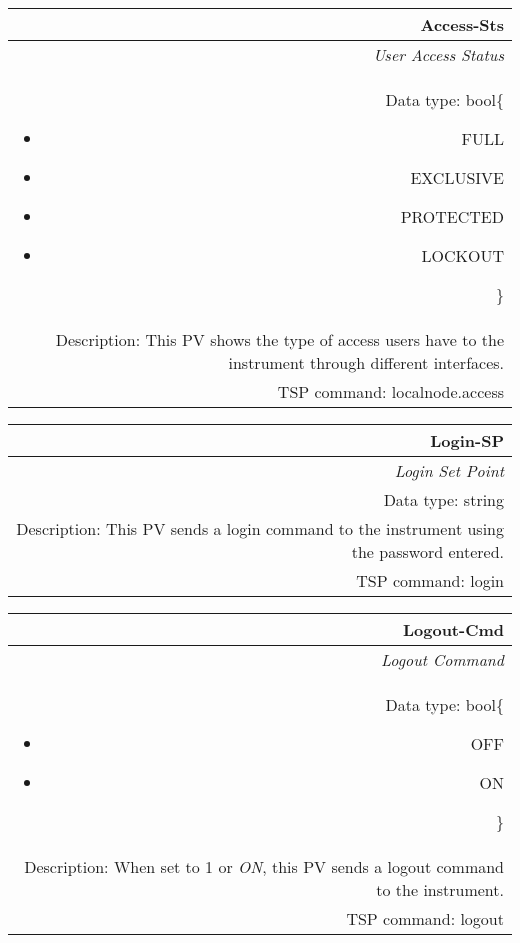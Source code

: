 \documentclass[openany]{article}
\begin{document}
		\begin{tabular}{N}
			\hline
			\bfseries Access-Sts\label{pv:access-sts} \\ \hline
			\emph{User Access Status} \\
			Data type: bool\{\begin{itemize}[noitemsep]
				\small
				\item[] FULL
				\item[] EXCLUSIVE
				\item[] PROTECTED
				\item[] LOCKOUT
			\end{itemize}\} \\
			Description: This PV shows the type of access users have to the instrument through different interfaces. \\
			TSP command: localnode.access
		\end{tabular}

		\begin{tabular}{N}
			\hline
			\bfseries Login-SP\label{pv:login-sp} \\ \hline
			\emph{Login Set Point} \\
			Data type: string \\
			Description: This PV sends a login command to the instrument using the password entered. \\
			TSP command: login
		\end{tabular}

		\begin{tabular}{N}
			\hline
			\bfseries Logout-Cmd\label{pv:logout-cmd} \\ \hline
			\emph{Logout Command} \\
			Data type: bool\{\begin{itemize}[noitemsep]
				\small
				\item[] OFF
				\item[] ON
			\end{itemize}\} \\
			Description: When set to 1 or \emph{ON}, this PV sends a logout command to the instrument. \\
			TSP command: logout
		\end{tabular}
\end{document}
